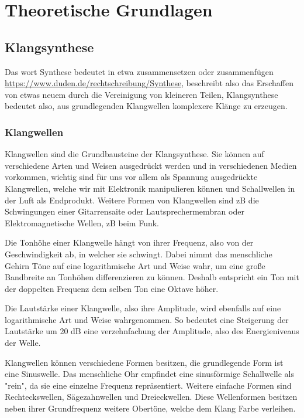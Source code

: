 \chapter{Theoretische Grundlagen}

\section{Klangsynthese}
\label{sec:org29dddc4}
Das wort Synthese bedeutet in etwa zusammensetzen oder zusammenfügen \url{https://www.duden.de/rechtschreibung/Synthese}, beschreibt also das Erschaffen von etwas neuem durch die Vereinigung von kleineren Teilen, Klangsynthese bedeutet also, aus grundlegenden Klangwellen komplexere Klänge zu erzeugen.

\subsection{Klangwellen}
\label{sec:orgd71e4ed}
Klangwellen sind die Grundbausteine der Klangsynthese. Sie können auf verschiedene Arten und Weisen ausgedrückt werden und in verschiedenen Medien vorkommen, wichtig sind für uns vor allem als Spannung ausgedrückte Klangwellen, welche wir mit Elektronik manipulieren können und Schallwellen in der Luft als Endprodukt. Weitere Formen von Klangwellen sind zB die Schwingungen einer Gitarrensaite oder Lautsprechermembran oder Elektromagnetische Wellen, zB beim Funk.

Die Tonhöhe einer Klangwelle hängt von ihrer Frequenz, also von der Geschwindigkeit ab, in welcher sie schwingt. Dabei nimmt das menschliche Gehirn Töne auf eine logarithmische Art und Weise wahr, um eine große Bandbreite an Tonhöhen differenzieren zu können. Deshalb entspricht ein Ton mit der doppelten Frequenz dem selben Ton eine Oktave höher.

Die Lautstärke einer Klangwelle, also ihre Amplitude, wird ebenfalls auf eine logarithmische Art und Weise wahrgenommen. So bedeutet eine Steigerung der Lautstärke um 20 \si{\dB} eine verzehnfachung der Amplitude, also des Energieniveaus der Welle.

Klangwellen können verschiedene Formen besitzen, die grundlegende Form ist eine Sinuswelle. Das menschliche Ohr empfindet eine sinusförmige Schallwelle als "rein", da sie eine einzelne Frequenz repräsentiert. Weitere einfache Formen sind Rechteckswellen, Sägezahnwellen und Dreieckwellen. Diese Wellenformen besitzen neben ihrer Grundfrequenz weitere Obertöne, welche dem Klang Farbe verleihen.

